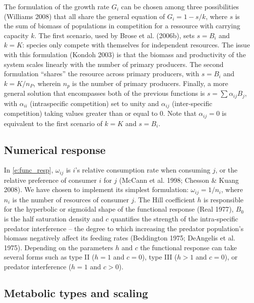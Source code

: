\documentclass[12pt]{article}
\begin{document}
The formulation of the growth rate \(G_i\) can be chosen among three
possibilities (Williams 2008) that all share the general equation of
\(G_i = 1 - s/k\), where \(s\) is the sum of biomass of populations in
competition for a ressource with carrying capacity \(k\). The first
scenario, used by Brose et al. (2006b), sets \(s = B_i\) and \(k = K\):
species only compete with themselves for independent resources. The
issue with this formulation (Kondoh 2003) is that the biomass and
productivity of the system scales linearly with the number of primary
producers. The second formulation ``shares'' the resource across primary
producers, with \(s = B_i\) and \(k = K/n_P\), wherein \(n_p\) is the
number of primary producers. Finally, a more general solution that
encompasses both of the previous functions is
\(s = \sum\alpha_{ij}B_j\), with \(\alpha_{ii}\) (intraspecific
competition) set to unity and \(\alpha_{ij}\) (inter-specific
competition) taking values greater than or equal to 0. Note that
\(\alpha_{ij} = 0\) is equivalent to the first scenario of \(k = K\) and
\(s = B_i\).

\subsection{Numerical response}\label{numerical-response}

In \autoref{e:func_resp}, \(\omega_{ij}\) is \(i\)'s relative
consumption rate when consuming \(j\), or the relative preference of
consumer \(i\) for \(j\) (McCann et al. 1998; Chesson \& Kuang 2008). We
have chosen to implement its simplest formulation:
\(\omega_{ij} = 1/n_i\), where \(n_i\) is the number of resources of
consumer \(j\). The Hill coefficient \(h\) is responsible for the
hyperbolic or sigmoïdal shape of the functional response (Real 1977),
\(B_0\) is the half saturation density and \(c\) quantifies the strength
of the intra-specific predator interference -- the degree to which
increasing the predator population's biomass negatively affect its
feeding rates (Beddington 1975; DeAngelis et al. 1975). Depending on the
parameters \(h\) and \(c\) the functional response can take several
forms such as type II (\(h = 1\) and \(c = 0\)), type III (\(h > 1\) and
\(c = 0\)), or predator interference (\(h = 1\) and \(c > 0\)).

\subsection{Metabolic types and
scaling}\label{metabolic-types-and-scaling}
\end{document}
